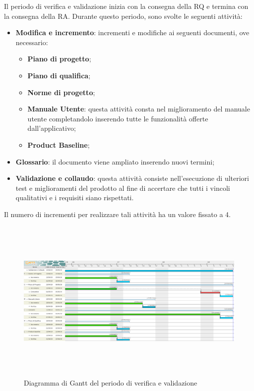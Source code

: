 Il periodo di verifica e validazione inizia con la consegna della RQ e termina con la consegna della RA.\newline
Durante questo periodo, sono svolte le seguenti attività:
\begin{itemize}
	\item \textbf{Modifica e incremento}: incrementi e modifiche ai seguenti documenti, ove necessario:
	\begin{itemize}
		\item \textbf{Piano di progetto};
		\item \textbf{Piano di qualifica};
		\item \textbf{Norme di progetto};
		\item \textbf{Manuale Utente}: questa attività consta nel miglioramento del manuale utente completandolo inserendo tutte le funzionalità offerte dall'applicativo;
		\item \textbf{Product Baseline};
	\end{itemize}
	\item \textbf{Glossario}: il documento viene ampliato inserendo nuovi termini;
	\item \textbf{Validazione e collaudo}: questa attività consiste nell’esecuzione di ulteriori test e miglioramenti del prodotto al fine di accertare che tutti i vincoli qualitativi e i requisiti siano rispettati.
\end{itemize}
Il numero di incrementi per realizzare tali attività ha un valore fissato a 4.

\begin{figure}[H]
		\hspace*{-1.5cm}
	\includegraphics[width=19.4cm, height=8cm]{Pianificazione/verificaValidazione.pdf}
	\caption{Diagramma di Gantt del periodo di verifica e validazione}
\end{figure}